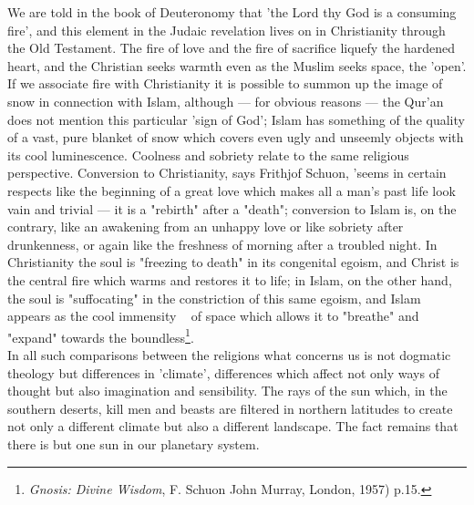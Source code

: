 \documentclass[11pt, b5paper, twoside]{book}
\begin{document}
We are told in the book of Deuteronomy that 'the Lord thy God is a consuming fire', and this element 
in the Judaic revelation lives on in Christianity through the Old Testament. The fire of love and the 
fire of sacrifice liquefy the hardened heart, and the Christian seeks warmth even as the Muslim seeks 
space, the 'open'. If we associate fire with Christianity it is possible to summon up the image of 
snow in connection with Islam, although --- for obvious reasons --- the Qur'an does not mention this 
particular 'sign of God'; Islam has something of the quality of a vast, pure blanket of snow which 
covers even ugly and unseemly objects with its cool luminescence. Coolness and sobriety relate to the 
same religious perspective. Conversion to Christianity, says Frithjof Schuon, 'seems in certain 
respects like the beginning of a great love which makes all a man's past life look vain and trivial --- 
it is a "rebirth" after a "death"; conversion to Islam is, on the contrary, like an awakening from an 
unhappy love or like sobriety after drunkenness, or again like the freshness of morning after a 
troubled night. In Christianity the soul is "freezing to death" in its congenital egoism, and Christ 
is the central fire which warms and restores it to life; in Islam, on the other hand, the soul is 
"suffocating" in the constriction of this same egoism, and Islam appears as the cool immensity ~ of 
space which allows it to "breathe" and "expand" towards the boundless\footnote{\emph{Gnosis: Divine Wisdom}, F. Schuon John Murray, London, 1957) p.15.}. \\

In all such comparisons between the religions what concerns us is not dogmatic theology but 
differences in 'climate', differences which affect not only ways of thought but also imagination and 
sensibility. The rays of the sun which, in the southern deserts, kill men and beasts are filtered in 
northern latitudes to create not only a different climate but also a different landscape. The fact 
remains that there is but one sun in our planetary system. \\
\end{document}
